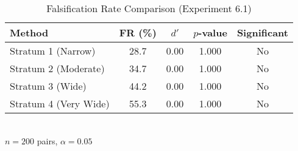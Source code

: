 \begin{table}[htbp]
\centering
\caption{Falsification Rate Comparison (Experiment 6.1)}
\label{tab:exp_6_1_results}
\begin{tabular}{lcccc}
\toprule
Method & FR (\%) & $d'$ & $p$-value & Significant \\ 
\midrule
Stratum 1 (Narrow) & 28.7 & 0.00 & 1.000 & No \\
Stratum 2 (Moderate) & 34.7 & 0.00 & 1.000 & No \\
Stratum 3 (Wide) & 44.2 & 0.00 & 1.000 & No \\
Stratum 4 (Very Wide) & 55.3 & 0.00 & 1.000 & No \\
\bottomrule
\end{tabular}
\\[0.5em] {\footnotesize $n=200$ pairs, $\alpha=0.05$}
\end{table}